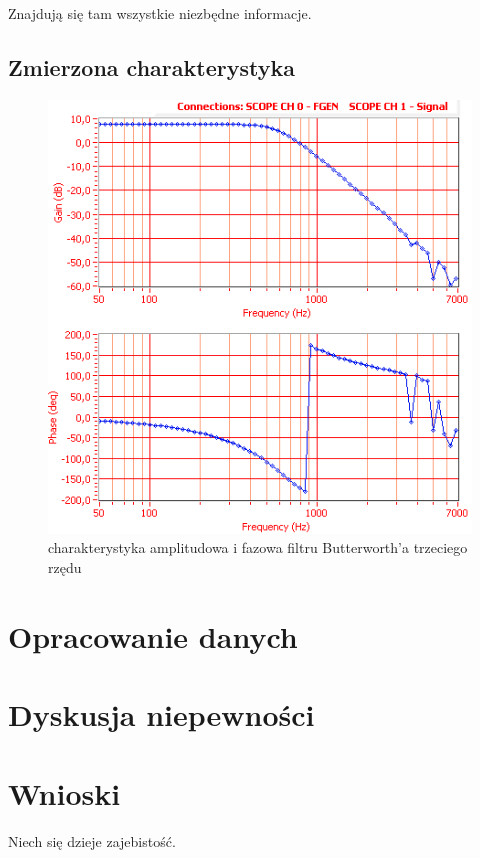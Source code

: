 \documentclass[a4paper,11pt]{article}
\begin{document}
Znajdują się tam wszystkie niezbędne informacje.
\subsection{Zmierzona charakterystyka}

\begin{figure}[H]
\begin{center}
\includegraphics{obrazki/maslowilkcialobialy.png}
\end{center}
\caption{charakterystyka amplitudowa i fazowa filtru Butterworth'a trzeciego rzędu}
\end{figure}

\section{Opracowanie danych}

\section{Dyskusja niepewności}

\section{Wnioski}


Niech się dzieje zajebistość.
\end{document}
